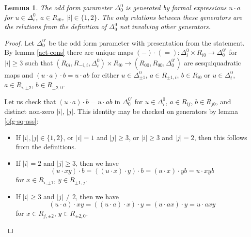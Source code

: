 \documentclass{article}
\newtheorem{lemma}{Lemma}
\theoremstyle{definition}
\begin{document}
\begin{lemma} \label{pres-form}
    The odd form parameter \(\Delta^0_0\) is generated by formal expressions \(u \cdot a\) for \(u \in \Delta^0_i\), \(a \in R_{i0}\), \(|i| \in \{1, 2\}\). The only relations between these generators are the relations from the definition of \(\Delta^0_0\) not involving other generators.
\end{lemma}
\begin{proof}
    Let \(\Delta^{0 \prime}_0\) be the odd form parameter with presentation from the statement. By lemma \ref{act-cons} there are unique maps \(
        ({-}) \cdot ({=})
        \colon \Delta^0_i \times R_{i0}
        \to \Delta^{0 \prime}_0
    \) for \(|i| \geq 3\) such that \(
        (R_{0i}, R_{-i, i}, \Delta^0_i) \times R_{i0}
        \to (R_{00}, R_{00}, \Delta^{0 \prime}_0)
    \) are sesquiquadratic maps and \(
        (u \cdot a) \cdot b = u \cdot ab
    \) for either \(u \in \Delta^0_{\pm 1}\), \(a \in R_{\pm 1, i}\), \(b \in R_{i0}\) or \(u \in \Delta^0_i\), \(a \in R_{i, \pm 2}\), \(b \in R_{\pm 2, 0}\).

    Let us check that \(
        (u \cdot a) \cdot b = u \cdot ab
    \) in \(\Delta^{0 \prime}_0\) for \(u \in \Delta^0_i\), \(a \in R_{ij}\), \(b \in R_{j0}\), and distinct non-zero \(|i|\), \(|j|\). This identity may be checked on generators by lemma \ref{ofg-sq-ass}:
    \begin{itemize}

        \item If \(
            |i|, |j| \in \{1, 2\}
        \), or \(|i| = 1\) and \(|j| \geq 3\), or \(|i| \geq 3\) and \(|j| = 2\), then this follows from the definitions.

        \item If \(|i| = 2\) and \(|j| \geq 3\), then we have \[
            (u \cdot xy) \cdot b
            =
            ((u \cdot x) \cdot y) \cdot b
            =
            (u \cdot x) \cdot yb
            =
            u \cdot xyb
        \] for \(x \in R_{i, \pm 1}\), \(y \in R_{\pm 1, j}\).

        \item If \(|i| \geq 3\) and \(|j| \neq 2\), then we have \[
            (u \cdot a) \cdot xy
            =
            ((u \cdot a) \cdot x) \cdot y
            =
            (u \cdot ax) \cdot y
            =
            u \cdot axy
        \] for \(x \in R_{j, \pm 2}\), \(y \in R_{\pm 2, 0}\).

    \end{itemize}


\end{proof}
\end{document}
